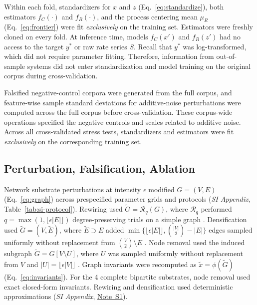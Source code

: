 \documentclass{article}
\begin{document}
Within each fold, standardizers for $x$ and $z$ (Eq.~\eqref{eq:standardize}), both estimators $f_C(\cdot)$ and $f_R(\cdot)$, and the process centering mean $\mu_R$ (Eq.~\eqref{eq:frontier}) were fit \textit{exclusively} on the training set. Estimators were freshly cloned on every fold. At inference time, models $f_C(x')$ and $f_R(z')$ had no access to the target $y^*$ or raw rate series $S$. Recall that $y^*$ was log-transformed, which did not require parameter fitting. Therefore, information from out-of-sample systems did not enter standardization and model training on the original corpus during cross-validation.

Falsified negative-control corpora were generated from the full corpus, and feature-wise sample standard deviations for additive-noise perturbations were computed across the full corpus before cross-validation. These corpus-wide operations specified the negative controls and scales related to additive noise. Across all cross-validated stress tests, standardizers and estimators were fit \textit{exclusively} on the corresponding training set.

\subsection*{Perturbation, Falsification, Ablation}
\label{sec:stress}
Network substrate perturbations at intensity $\epsilon$ modified $G = (V, E)$ (Eq.~\eqref{eq:graph}) across prespecified parameter grids and protocols (\textit{SI Appendix}, Table~\ref{tab:si-protocol}). Rewiring used $\widetilde{G} = \mathcal{R}_q(G)$, where $\mathcal{R}_q$ performed $q = \max(1, \lfloor \epsilon\lvert E \rvert \rfloor)$ degree-preserving trials on a simple graph \citep{ref56}. Densification used $\widetilde{G} = (V, \widetilde{E})$, where $\widetilde{E} \supset E$ added $\min\{\lfloor \epsilon\lvert E \rvert \rfloor, \binom{\lvert V \rvert}{2} - \lvert E \rvert\}$ edges sampled uniformly without replacement from $\binom{V}{2} \setminus E$ \citep{ref106}. Node removal used the induced subgraph $\widetilde{G} = G[V \setminus U]$, where $U$ was sampled uniformly without replacement from $V$ and $\lvert U \rvert = \lfloor \epsilon\lvert V \rvert \rfloor$ \citep{ref104,ref105}. Graph invariants were recomputed as $\widetilde{x} = \phi(\widetilde{G})$ (Eq.~\eqref{eq:invariants}). For the 4 complete bipartite substrates, node removal used exact closed-form invariants. Rewiring and densification used deterministic approximations (\textit{SI Appendix}, \hyperref[sec:si-note-bipartite]{Note~S1}).
\end{document}
